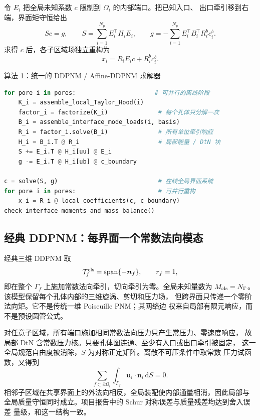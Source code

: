 \documentclass[UTF8,zihao=-4]{ctexart}
\newcommand{\T}{\mathcal{T}}
\newcommand{\normal}{\bm n}
\newcommand{\dd}{\,\mathrm d}
\newcommand{\Span}{\operatorname{span}}
\begin{document}
令 $E_i$ 把全局未知系数 $c$ 限制到 $\Omega_i$ 的内部端口。把已知入口、
出口牵引移到右端，界面矩守恒给出
\begin{equation}\label{eq:schur}
  Sc=g,\qquad
  S=\sum_{i=1}^{N_p}E_i^\top H_iE_i,\qquad
  g=-\sum_{i=1}^{N_p}E_i^\top B_i^\top R_i^b c_i^b.
\end{equation}
求得 $c$ 后，各子区域场独立重构为
\begin{equation}\label{eq:reconstruct}
  x_i=R_iE_ic+R_i^bc_i^b.
\end{equation}

\begin{algobox}{算法 1：统一的 DDPNM / Affine-DDPNM 求解器}
\begin{lstlisting}[style=compactcode,language=Python]
for pore i in pores:                      # 可并行的离线阶段
    K_i = assemble_local_Taylor_Hood(i)
    factor_i = factorize(K_i)              # 每个孔体只分解一次
    B_i = assemble_interface_mode_loads(i, basis)
    R_i = factor_i.solve(B_i)              # 所有单位牵引响应
    H_i = B_i.T @ R_i                      # 局部能量 / DtN 块
    S += E_i.T @ H_i[uu] @ E_i
    g -= E_i.T @ H_i[ub] @ c_boundary

c = solve(S, g)                            # 在线全局界面系统
for pore i in pores:                       # 可并行重构
    x_i = R_i @ local_coefficients(c, c_boundary)
check_interface_moments_and_mass_balance()
\end{lstlisting}
\end{algobox}

\subsection{经典 DDPNM：每界面一个常数法向模态}

经典三维 DDPNM 取
\begin{equation}\label{eq:classic-space}
  \T_f^{\rm cls}=\Span\{-\normal_f\},\qquad r_f=1,
\end{equation}
即在整个 $\Gamma_f$ 上施加常数法向牵引，切向牵引为零。全局未知量数为
$M_{\rm cls}=N_\Gamma$。该模型保留每个孔体内部的三维旋涡、剪切和压力场，
但跨界面只传递一个零阶法向矩。它不是传统一维 Poiseuille PNM；其网络边
权来自局部有限元响应，而不是预设圆管公式。

对任意子区域，所有端口施加相同常数法向压力只产生常压力、零速度响应，
故局部 DtN 含常数压力核。只要孔体图连通、至少有入口或出口牵引被固定，
这一全局规范自由度被消除，$S$ 为对称正定矩阵。离散不可压条件中取常数
压力试函数，又得到
\begin{equation}
  \sum_{f\subset\partial\Omega_i}
  \int_{\Gamma_f}\bm u_i\cdot\bm n_i\dd S=0.
\end{equation}
相邻子区域在共享界面上的外法向相反，全局装配使内部通量相消，因此局部与
全局质量守恒同时成立。项目报告中的 Schur 对称误差与质量残差均达到舍入误差
量级，和这一结构一致。
\end{document}
